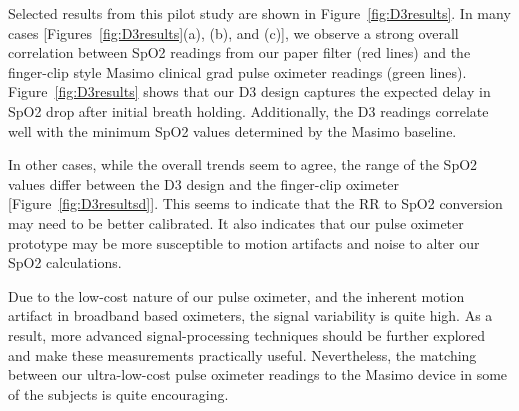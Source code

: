         Selected results from this pilot study are shown in Figure~\ref{fig:D3results}. In many cases [Figures~\ref{fig:D3results}(a), (b), and (c)], we observe a strong overall correlation between SpO2 readings from our paper filter (red lines) and the finger-clip style Masimo clinical grad pulse oximeter readings (green lines). Figure~\ref{fig:D3results} shows that our D3 design captures the expected delay in SpO2 drop after initial breath holding. Additionally, the D3 readings correlate well with the minimum SpO2 values determined by the Masimo baseline. 
        
        In other cases, while the overall trends seem to agree, the range of the SpO2 values differ between the D3 design and the finger-clip oximeter [Figure~\ref{fig:D3resultsd}]. This seems to indicate that the RR to SpO2 conversion may need to be better calibrated. It also indicates that our pulse oximeter prototype may be more susceptible to motion artifacts and noise to alter our SpO2 calculations. 
        
        Due to the low-cost nature of our pulse oximeter, and the inherent motion artifact in broadband based oximeters, the signal variability is quite high. As a result, more advanced signal-processing techniques should be further explored and make these measurements practically useful. Nevertheless, the matching between our ultra-low-cost pulse oximeter readings to the Masimo device in some of the subjects is quite encouraging. 




